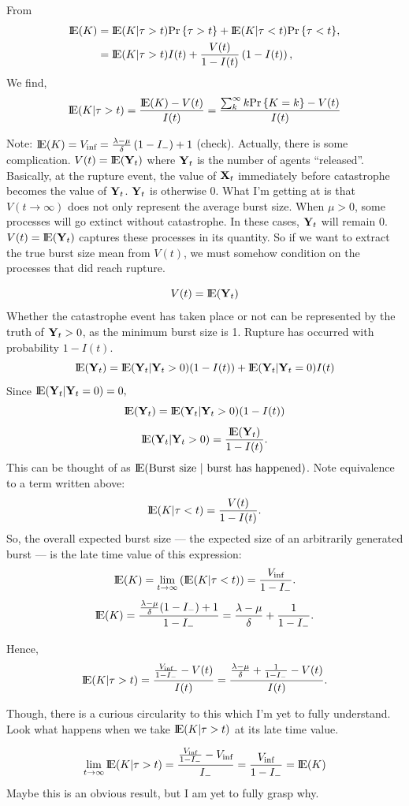 From 
\begin{align}
{\rm I}\!{\rm E}(K) &= {\rm I}\!{\rm E}(K| \tau > t) {\text{Pr}\left\{\tau > t\right\}} + {\rm I}\!{\rm E}(K| \tau < t){\text{Pr}\left\{\tau<t\right\}},\\
&= {\rm I}\!{\rm E}(K|\tau > t) I(t) + \frac{V(t)}{1 - I(t)} \left(1 - I(t)\right),
\end{align}
We find,
$${\rm I}\!{\rm E}(K| \tau > t)  = \frac{{\rm I}\!{\rm E}(K) - V(t)}{I(t)}   =   \frac{  \sum^{\infty}_{k} k {\text{Pr}\left\{K = k\right\}}  - V(t)}{I(t)}$$

Note: ${\rm I}\!{\rm E}(K) = V_{\text{inf}} = \frac{\lambda - \mu}{\delta} \left(1 - I_-\right) + 1$ (check). Actually, there is some complication. $V(t) = {\rm I}\!{\rm E}({{\bf Y}_t})$ where ${{\bf Y}_t}$ is the number of agents ``released''. Basically, at the rupture event, the value of ${{\bf X}_t}$ immediately before catastrophe becomes the value of ${{\bf Y}_t}$. ${{\bf Y}_t}$ is otherwise 0. What I'm getting at is that $V(t\to \infty)$ does not only represent the average burst size. When $\mu > 0$, some processes will go extinct without catastrophe. In these cases, ${{\bf Y}_t}$ will remain 0. $V(t) = {\rm I}\!{\rm E}({{\bf Y}_t})$ captures these processes in its quantity. So if we want to extract the true burst size mean from $V(t)$, we must somehow condition on the processes that did reach rupture. 

$$V(t) = {\rm I}\!{\rm E}({{\bf Y}_t})$$ 
Whether the catastrophe event has taken place or not can be represented by the truth of ${{\bf Y}_t}>0$, as the minimum burst size is 1. Rupture has occurred with probability $1 - I(t)$.
$${\rm I}\!{\rm E}({{\bf Y}_t}) = {\rm I}\!{\rm E}({{\bf Y}_t}|{{\bf Y}_t} > 0)(1-I(t)) + {{\rm I}\!{\rm E}({{\bf Y}_t} | {{\bf Y}_t} = 0)}I(t)$$
Since $ {{\rm I}\!{\rm E}({{\bf Y}_t} | {{\bf Y}_t} = 0)} = 0,$
$${\rm I}\!{\rm E}({{\bf Y}_t}) = {\rm I}\!{\rm E}({{\bf Y}_t}|{{\bf Y}_t} > 0)(1-I(t))$$
$$ {\rm I}\!{\rm E}({{\bf Y}_t}|{{\bf Y}_t} > 0) = \frac{{\rm I}\!{\rm E}({{\bf Y}_t})}{1-I(t)}.$$
This can be thought of as ${\rm I}\!{\rm E}(\text{Burst size } | \text{ burst has happened})$. Note equivalence to a term written above:
$${\rm I}\!{\rm E}(K | \tau < t) =\frac{V(t)}{1-I(t)}. $$
So, the overall expected burst size --- the expected size of an arbitrarily generated burst --- is the late time value of this expression: 
$${\rm I}\!{\rm E}(K) = \lim_{t\to \infty} \left({\rm I}\!{\rm E}(K| \tau < t)\right) = \frac{V_{\text{inf}}}{1 - I_-}.$$
$${\rm I}\!{\rm E}(K) = \frac{\frac{\lambda - \mu}{\delta}(1-I_-) + 1}{1-I_-} = \frac{\lambda - \mu}{\delta} + \frac{1}{1-I_-}.$$

Hence, 
$${\rm I}\!{\rm E}(K|\tau > t) = \frac{\frac{V_{\text{inf}}}{1 - I_-} - V(t)}{I(t)} =  \frac{\frac{\lambda - \mu}{\delta} + \frac{1}{1-I_-} - V(t)}{I(t)}.$$

Though, there is a curious circularity to this which I'm yet to fully understand. Look what happens when we take ${\rm I}\!{\rm E}(K|\tau> t)$ at its late time value. 

$$\lim_{t\to\infty}{\rm I}\!{\rm E}(K|\tau > t) = \frac{\frac{V_{\text{inf}}}{1 - I_-} - V_{\text{inf}}}{I_-}  = \frac{V_{\text{inf}}}{1 - I_-} = {\rm I}\!{\rm E}(K)$$
Maybe this is an obvious result, but I am yet to fully grasp why.













